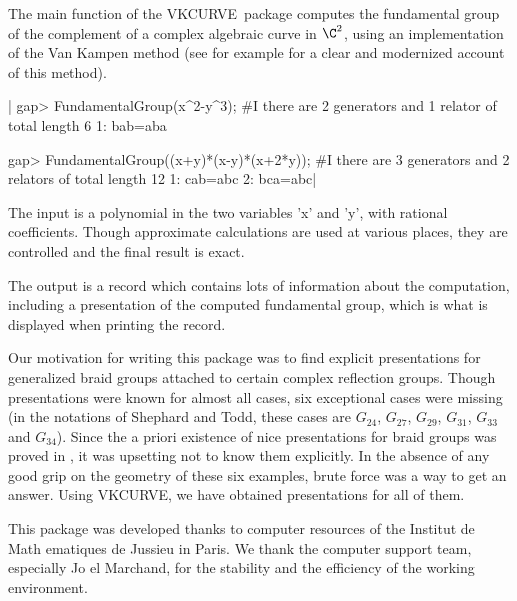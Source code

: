\def\VKCURVE{{\sf VKCURVE}}
\def\CHEVIE{{\sf CHEVIE}}

The  main function of the \VKCURVE\  package computes the fundamental group
of  the  complement  of  a  complex  algebraic  curve  in  $\C^2$, using an
implementation  of the Van Kampen method  (see for example \cite{C73} for a
clear and modernized account of this method).

|    gap> FundamentalGroup(x^2-y^3);
    #I  there are 2 generators and 1 relator of total length 6
    1: bab=aba
    
    gap> FundamentalGroup((x+y)*(x-y)*(x+2*y));
    #I  there are 3 generators and 2 relators of total length 12
    1: cab=abc
    2: bca=abc|

The  input is  a  polynomial in  the  two variables  'x'  and 'y',  with
rational  coefficients.  Though  approximate calculations  are  used  at
various places, they are controlled and the final result is exact.

The output is a  record which  contains lots  of information  about the
computation, including a presentation of the computed fundamental group,
which is what is displayed when printing the record.

Our  motivation   for  writing  this   package  was  to   find  explicit
presentations for  generalized braid groups attached  to certain complex
reflection groups. Though presentations were known for almost all cases,
six exceptional  cases were  missing (in the  notations of  Shephard and
Todd, these  cases are $G_{24}$, $G_{27}$,  $G_{29}$, $G_{31}$, $G_{33}$
and $G_{34}$).  Since the a  priori existence of nice  presentations for
braid groups was proved in \cite{B01}, it was upsetting not to know them
explicitly. In the absence of any good grip on the geometry of these six
examples, brute force  was a way to  get an answer. Using  \VKCURVE , we
have  obtained  presentations for  all of them.

This package was developed thanks to computer resources of the Institut
de Math  ematiques de Jussieu in Paris. We  thank the computer
support team,  especially Jo  el Marchand, for  the stability
and the efficiency of the working environment.

